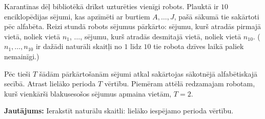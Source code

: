 \documentclass[a4paper,12pt]{article}
\newcommand\answer[1]{}
\begin{document}
\vspace{10pt}
\begin{problem}
Karantīnas dēļ bibliotēkā drīkst uz\-tu\-rē\-ties vienīgi robots.
Plauktā ir $10$ enciklopēdijas sējumi, kas apzīmēti ar burtiem $A,\ldots,J$,
pašā sākumā tie sakārtoti pēc alfabēta.
Reizi stundā robots sējumus pārkārto:
sējumu, kurš atradās pirmajā vietā, noliek
vie\-tā $n_1$, $\ldots$, sējumu, kurš atradās desmitajā vietā, noliek vietā
$n_{10}$. ($n_1,\allowbreak\ldots,\allowbreak{}n_{10}$ ir dažādi
naturāli skaitļi no $1$ līdz $10$ \textendash{} tie robota dzīves laikā paliek nemainīgi.)

Pēc tieši $T$ šādām pārkārtošanām sējumi atkal sakārtojas sākotnējā al\-fa\-bē\-tis\-kajā 
secībā. Atrast lielāko perioda $T$ vērtību. Piemēram attēlā 
redzamajam robotam, kurš vienkārši blakusesošos sējumus apmaina vietām, $T=2$. 

{\bf Jautājums:} Ierakstīt naturālu skaitli: lielāko iespējamo perioda vērtību.
\answer{

{\bf Atbilde:} $\mathtt{30}$ (\textcolor{orange}{1 punkts}).\\
{\bf Daļējās atbildes.} Var dabūt arī periodus $\mathtt{12}$, $\mathtt{15}$ vai $\mathtt{21}$ (\textcolor{orange}{0.5 punkts}).\\
Grāmatu pārkārtošanu atbilstoši vienam un tam pašam musturam, kurā norādīts,
uz kuru vietu pārceļ katru no grāmatām, sauc par saraksta {\em permutāciju}.
Desmit grāmatām ie\-spē\-ja\-mas pavisam $10! = 3628800$ (tik veidos
var ieprogrammēt grāmatu jaukšanas robotu).

Permutācijām var veidot {\em kompozīcijas}, tās pie\-lie\-to\-jot vienu pēc otras
(vispirms pārkārto pēc viena mustura, tad pēc otra).
Starp visām permutācijām īpaša loma ir {\em vienības permutācijai}, kura atstāj
visas grāmatas uz vietas. Mūs interesē, cik reizes permutācija ``jāreizina'' pati ar sevi, lai 
iegūtu vienības permutāciju (to sauksim par {\em permutācijas kārtu} jeb {\em order of a permutation}).

{\bf Definīcija} Katrai permutācijai par {\em ciklu} sau\-cam tādu grāmatu virkni
ar numuriem\\ $a_1,\ldots,a_n$, kas šajā permutācijā mainās ``pa apli'':
$a_1$ nonāk vietā $a_2$, $a_2$ nonāk $a_3$,
utt. Visbeidzot $a_n$ nonāk $a_1$.
Ja grāmata paliek uz vietas, to raksta kā ciklu garumā $1$.

}
\end{problem}
\end{document}
